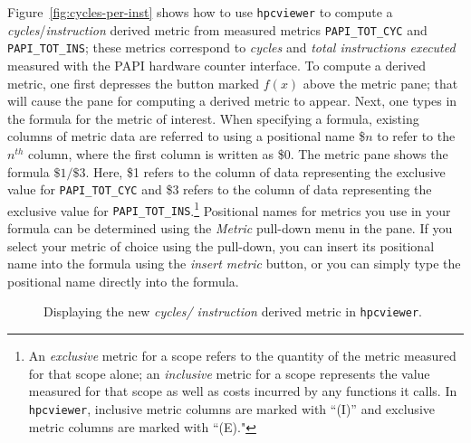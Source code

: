 \documentclass[12pt]{article}
\begin{document}
Figure~\ref{fig:cycles-per-inst} shows how to use {\tt hpcviewer} to compute a {\em cycles}/{\em instruction} derived metric from measured metrics {\tt PAPI\_TOT\_CYC}  and {\tt PAPI\_TOT\_INS}; these metrics correspond to {\em cycles} and {\em total instructions executed} measured with the PAPI hardware counter interface. To compute a derived metric, one first depresses the button marked $f(x)$ above the metric pane; that will cause the pane for computing a derived metric to appear. Next, one types in the formula for the metric of interest. When specifying a formula, existing columns of metric data are referred to using a positional name \$$n$ to refer to the $n^{th}$ column, where the first column is written as \$0. The metric pane shows the formula $\$1/\$3$. Here, \$1 refers to the column of data representing the exclusive value for {\tt PAPI\_TOT\_CYC} and \$3 refers to the column of data representing the exclusive value for {\tt PAPI\_TOT\_INS}.\footnote{An {\em exclusive} metric for a scope refers to the quantity of the metric measured for that scope alone; an {\em inclusive} metric for a scope represents the value measured for that scope as well as costs incurred by any functions it calls. In {\tt hpcviewer}, inclusive metric columns are marked with ``(I)'' and exclusive metric columns are marked with ``(E)." } Positional names for metrics you use in your formula can be determined using the {\em Metric} pull-down menu in the pane. If you select your metric of choice using the pull-down, you can insert its positional name into the formula using the {\em insert metric} button, or you can simply type the positional name directly into the formula. 

\begin{figure}[t]
\caption{Displaying the new {\em cycles/ instruction} derived metric  in {\tt hpcviewer}.}
\label{fig:cycles-per-inst-2}
\end{figure}
\end{document}
